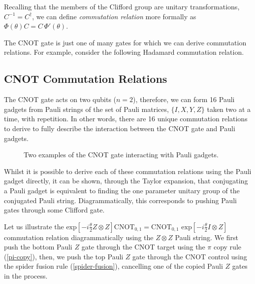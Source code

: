 Recalling that the members of the Clifford group are unitary transformations, $C^{-1} = C^\dagger$, we can define \textit{commutation relation} more formally as $\Phi(\theta) C = C \, \Phi'(\theta)$.


The CNOT gate is just one of many gates for which we can derive commutation relations. For example, consider the following Hadamard commutation relation.



\subsection{CNOT Commutation Relations}

The CNOT gate acts on two qubits ($n = 2$), therefore, we can form 16 Pauli gadgets from Pauli strings of the set of Pauli matrices, $\{I, X, Y, Z\}$ taken two at a time, with repetition. In other words, there are 16 unique commutation relations to derive to fully describe the interaction between the CNOT gate and Pauli gadgets.

\begin{figure}[H]
    \centering
    \caption{Two examples of the CNOT gate interacting with Pauli gadgets.}
\end{figure}

Whilst it is possible to derive each of these commutation relations using the Pauli gadget directly, it can be shown, through the Taylor expansion, that conjugating a Pauli gadget is equivalent to finding the one parameter unitary group of the conjugated Pauli string. Diagrammatically, this corresponds to pushing Pauli gates through some Clifford gate.

Let us illustrate the $\text{exp} \left[ - i\frac{\theta}{2} Z \otimes Z \right] \text{CNOT}_{0, 1} = \text{CNOT}_{0, 1} \,\, \text{exp} \left[ - i\frac{\theta}{2} I \otimes Z \right]$ commutation relation diagrammatically using the $Z \otimes Z$ Pauli string. We first push the bottom Pauli $Z$ gate through the CNOT target using the $\pi$ copy rule (\ref{pi-copy}), then, we push the top Pauli $Z$ gate through the CNOT control using the spider fusion rule (\ref{spider-fusion}), cancelling one of the copied Pauli $Z$ gates in the process.


